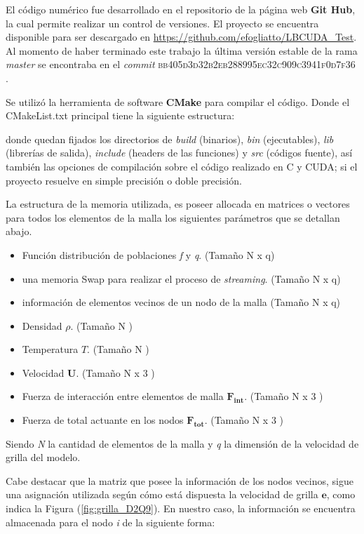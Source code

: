 El código numérico fue desarrollado en el repositorio de la página web \textbf{Git Hub}, la cual permite realizar un control de versiones. El proyecto se encuentra disponible para ser descargado en \url{https://github.com/efogliatto/LBCUDA_Test}. Al momento de haber terminado este trabajo la última versión estable de la rama \textit{master} se encontraba en el \textit{commit} \textsc{bb405d3d32b2eb288995ec32c909c3941f0d7f36} .

Se utilizó la herramienta de software \textbf{CMake} para compilar el código. Donde el CMakeList.txt principal tiene la siguiente estructura: 


donde quedan fijados los directorios de \textit{build} (binarios), \textit{bin} (ejecutables), \textit{lib} (librerías de salida), \textit{include} (headers de las funciones) y \textit{src} (códigos fuente), así también las opciones de compilación sobre el código realizado en C y CUDA; si el proyecto resuelve en simple precisión o doble precisión.

La estructura de la memoria utilizada, es poseer allocada en matrices o vectores para todos los elementos de la malla los siguientes parámetros que se detallan abajo.

\begin{itemize}
	\item Función distribución de poblaciones \textit{f} y \textit{q}. (Tamaño N x q)
	\item una memoria Swap para realizar el proceso de \textit{streaming}. (Tamaño N x q)
	\item información de elementos vecinos de un nodo de la malla (Tamaño N x q)
	\item Densidad $\rho$. (Tamaño N )
	\item Temperatura $T$. (Tamaño N )
	\item Velocidad $\mathbf{U}$. (Tamaño N x 3 )
	\item Fuerza de interacción entre elementos de malla $\mathbf{F_{int}}$. (Tamaño N x 3 )
	\item Fuerza de total actuante en los nodos $\mathbf{F_{tot}}$. (Tamaño N x 3 )
	
\end{itemize}

Siendo \textit{N} la cantidad de elementos de la malla y \textit{q} la dimensión de la velocidad de grilla del modelo.

Cabe destacar que la matriz que posee la información de los nodos vecinos, sigue una asignación utilizada según cómo está dispuesta la velocidad de grilla $\mathbf{e}$, como indica la Figura (\ref{fig:grilla_D2Q9}). En nuestro caso, la información se encuentra almacenada para el nodo \textit{i} de la siguiente forma:

